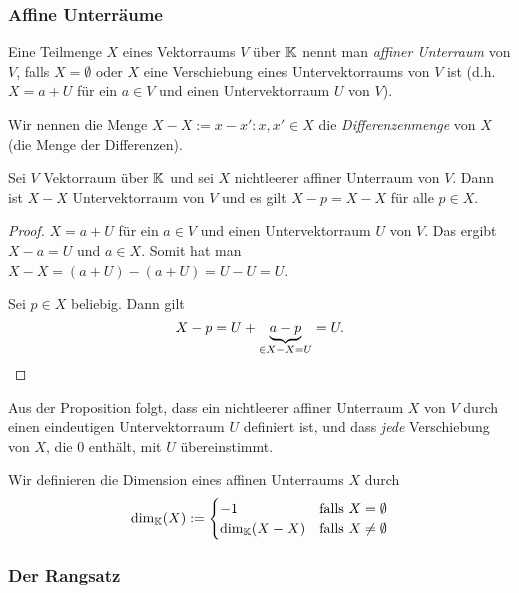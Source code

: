 \subsubsection{Affine Unterräume}

Eine Teilmenge $ X $ eines Vektorraums $ V $ über $ \mathbb K $ nennt man \emph{affiner Unterraum} von $ V $, falls $ X = \emptyset $ oder $ X $ eine Verschiebung eines Untervektorraums von $ V $ ist (d.h. $ X = a + U $ für ein $ a \in V $ und einen Untervektorraum $ U $ von $ V $).


Wir nennen die Menge $ X-X := {x-x' : x,x' \in X} $ die \emph{Differenzenmenge} von $ X $ (die Menge der Differenzen).

\begin{propn}
	Sei $ V $ Vektorraum über $ \mathbb K $ und sei $ X $ nichtleerer affiner Unterraum von $ V $. Dann ist $ X-X $ Untervektorraum von $ V $ und es gilt $ X-p = X-X $ für alle $ p \in X $.
\end{propn}
\begin{proof}
	$ X = a + U $ für ein $ a \in V $ und einen Untervektorraum $ U $ von $ V $. Das ergibt $ X-a = U $ und $ a \in X $. Somit hat man $ X-X = (a+U)-(a+U) = U-U = U $.
	
	Sei $ p \in X $ beliebig. Dann gilt
	\begin{equation*}
		X - p = U + \underbrace{a - p}_{\in X-X = U} = U. \qedhere
	\end{equation*}
\end{proof}

Aus der Proposition folgt, dass ein nichtleerer affiner Unterraum $ X $ von $ V $ durch einen eindeutigen Untervektorraum $ U $ definiert ist, und dass \emph{jede} Verschiebung von $ X $, die 0 enthält, mit $ U $ übereinstimmt.

Wir definieren die Dimension eines affinen Unterraums $ X $ durch
\begin{equation}
	\dim_\mathbb K(X) :=
	\begin{cases}
		-1 & \text{falls $ X = \emptyset $}\\
		\dim_\mathbb K(X-X) & \text{falls $ X \neq \emptyset $}
	\end{cases}
\end{equation}

\subsubsection{Der Rangsatz}

